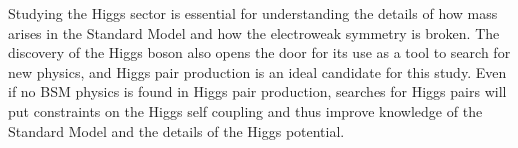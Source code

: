 Studying the Higgs sector is essential for understanding the details of how mass arises in the Standard Model and how the electroweak symmetry is broken. The discovery of the Higgs boson also opens the door for its use as a tool to search for new physics, and Higgs pair production is an ideal candidate for this study. Even if no BSM physics is found in Higgs pair production, searches for Higgs pairs will put constraints on the Higgs self coupling and thus improve knowledge of the Standard Model and the details of the Higgs potential. 






